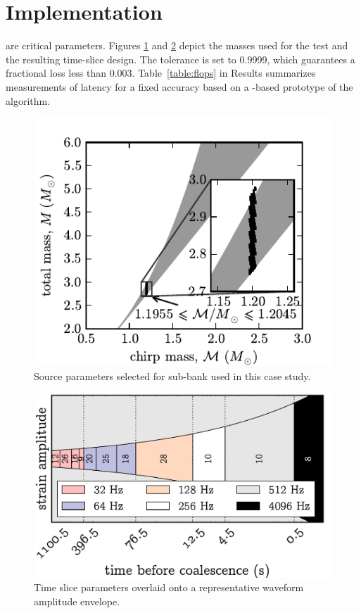 \documentclass[portrait,plainboxedsections]{sciposter}
\begin{document}
\begin{minipage}[t]{0.25\textwidth}

\section*{Implementation}

 are critical parameters. Figures
\ref{fig:tmpltbank} and \ref{fig:time_slices}
depict the masses used for the test and the resulting time-slice design. The
\SVD{} tolerance is set to 0.9999, which guarantees a fractional \SNR{} loss
less than 0.003. Table~\ref{table:flops} in Results summarizes measurements of
latency for a fixed accuracy based on a \gstreamer{}-based prototype of the
\lloid{} algorithm.

\begin{figure}[h]
	\includegraphics[width=1.1\textwidth]{figures/tmpltbank}
	\caption{\label{fig:tmpltbank}Source parameters selected for sub-bank used in this
case study.}
\end{figure}

\begin{figure}
\includegraphics[width=\textwidth]{figures/envelope}
\caption{\label{fig:time_slices} Time slice parameters overlaid onto a representative waveform amplitude envelope.}
\end{figure}


\end{minipage}
\end{document}
